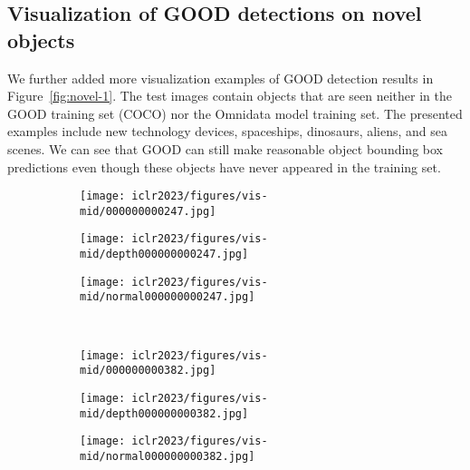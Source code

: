 \documentclass{article} \usepackage{iclr2023_conference,times}
\begin{document}
\subsection{Visualization of GOOD detections on novel objects}
We further added more visualization examples of GOOD detection results in Figure~\ref{fig:novel-1}. The test images contain objects that are seen neither in the GOOD training set (COCO) nor the Omnidata model training set. The presented examples include new technology devices, spaceships, dinosaurs, aliens, and sea scenes. We can see that GOOD can still make reasonable object bounding box predictions even though these objects have never appeared in the training set.



\begin{figure}
     \centering
     \begin{subfigure}[b]{0.32\textwidth}
         \centering
         \texttt{[image: iclr2023/figures/vis-mid/000000000247.jpg]}
\label{fig:y equals x}
     \end{subfigure}
     \hfill
     \begin{subfigure}[b]{0.32\textwidth}
         \centering
         \texttt{[image: iclr2023/figures/vis-mid/depth000000000247.jpg]}
\label{fig:three sin x}
     \end{subfigure}
     \hfill
     \begin{subfigure}[b]{0.32\textwidth}
         \centering
         \texttt{[image: iclr2023/figures/vis-mid/normal000000000247.jpg]}
\label{fig:five over x}
     \end{subfigure}
     \\
      \begin{subfigure}[b]{0.32\textwidth}
         \centering
         \texttt{[image: iclr2023/figures/vis-mid/000000000382.jpg]}
\label{fig:y equals x}
     \end{subfigure}
     \hfill
     \begin{subfigure}[b]{0.32\textwidth}
         \centering
         \texttt{[image: iclr2023/figures/vis-mid/depth000000000382.jpg]}
\label{fig:three sin x}
     \end{subfigure}
     \hfill
     \begin{subfigure}[b]{0.32\textwidth}
         \centering
         \texttt{[image: iclr2023/figures/vis-mid/normal000000000382.jpg]}
\label{fig:five over x}
     \end{subfigure}

\end{figure}
\end{document}
